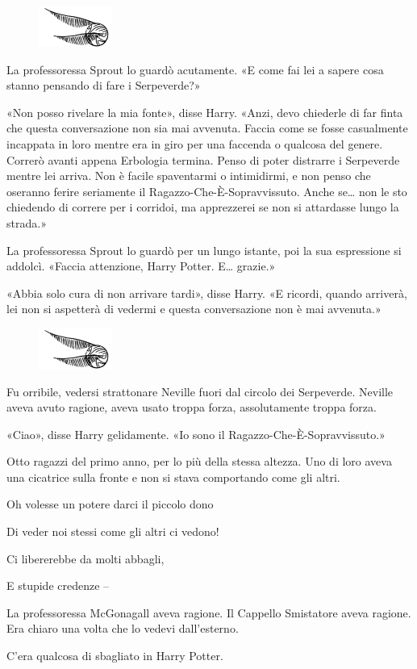 \begin{figure}[h!]
        \includegraphics[scale=0.4]{boccino.png}
        \centering
\end{figure}

La professoressa Sprout lo guardò acutamente. «E come fai lei a sapere cosa stanno pensando di fare i Serpeverde?»

«Non posso rivelare la mia fonte», disse Harry. «Anzi, devo chiederle di far finta che questa conversazione non sia mai avvenuta. Faccia come se fosse casualmente incappata in loro mentre era in giro per una faccenda o qualcosa del genere. Correrò avanti appena Erbologia termina. Penso di poter distrarre i Serpeverde mentre lei arriva. Non è facile spaventarmi o intimidirmi, e non penso che oseranno ferire seriamente il Ragazzo-Che-È-Sopravvissuto. Anche se… non le sto chiedendo di correre per i corridoi, ma apprezzerei se non si attardasse lungo la strada.»

La professoressa Sprout lo guardò per un lungo istante, poi la sua espressione si addolcì. «Faccia attenzione, Harry Potter. E… grazie.»

«Abbia solo cura di non arrivare tardi», disse Harry. «E ricordi, quando arriverà, lei non si aspetterà di vedermi e questa conversazione non è mai avvenuta.»

\begin{figure}[h!]
        \includegraphics[scale=0.4]{boccino.png}
        \centering
\end{figure}

Fu orribile, vedersi strattonare Neville fuori dal circolo dei Serpeverde. Neville aveva avuto ragione, aveva usato troppa forza, assolutamente troppa forza.

«Ciao», disse Harry gelidamente. «Io sono il Ragazzo-Che-È-Sopravvissuto.»

Otto ragazzi del primo anno, per lo più della stessa altezza. Uno di loro aveva una cicatrice sulla fronte e non si stava comportando come gli altri.

Oh volesse un potere darci il piccolo dono

Di veder noi stessi come gli altri ci vedono!

Ci libererebbe da molti abbagli,

E stupide credenze –

La professoressa McGonagall aveva ragione. Il Cappello Smistatore aveva ragione. Era chiaro una volta che lo vedevi dall’esterno.

C’era qualcosa di sbagliato in Harry Potter.




